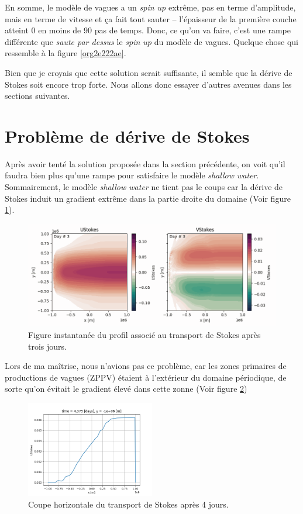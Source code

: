 \documentclass[10pt]{article}
\numberwithin{equation}{section}
\begin{document}
En somme, le modèle de vagues a un \emph{spin up} extrême, pas en terme d'amplitude, mais en terme de vitesse et ça fait tout sauter -- l'épaisseur de la première couche atteint 0 en moins de 90 pas de temps.
Donc, ce qu'on va faire, c'est une rampe différente que \emph{saute par dessus} le \emph{spin up} du modèle de vagues.
Quelque chose qui ressemble à la figure \ref{org2e222ae}. \bigskip

Bien que je croyais que cette solution serait suffisante, il semble que la dérive de Stokes soit encore trop forte.
Nous allons donc essayer d'autres avenues dans les sections suivantes. 
\section{Problème de dérive de Stokes}
\label{sec:org1dd1adb}
Après avoir tenté la solution proposée dans la section précédente, on voit qu'il faudra bien plus qu'une rampe pour satisfaire le modèle \emph{shallow water}.
Sommairement, le modèle \emph{shallow water} ne tient pas le coups car la dérive de Stokes induit un gradient extrême dans la partie droite du domaine (Voir figure \ref{fig:org11a1dd7}).

\begin{figure}[htbp]
\centering
\includegraphics[width=.9\linewidth]{figures/debuggage/2023_10_13_UStokes.png}
\caption{\label{fig:org11a1dd7}Figure instantanée du profil associé au transport de Stokes après trois jours.}
\end{figure}

Lors de ma maîtrise, nous n'avions pas ce problème, car les zones primaires de productions de vagues (ZPPV) étaient à l'extérieur du domaine périodique, de sorte qu'on évitait le gradient élevé dans cette zonne (Voir figure \ref{fig:org664f63b})

\begin{figure}[!htpb]
\centering
\includegraphics[width=0.5\textwidth]{figures/debuggage/2023_10_13_Stokes_coupe.png}
\caption{\label{fig:org664f63b}Coupe horizontale du transport de Stokes après 4 jours.}
\end{figure}
\end{document}
